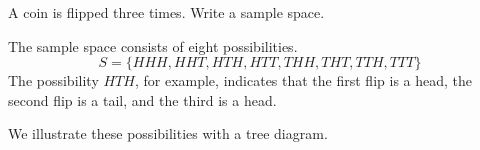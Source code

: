 \begin{example}
    A coin is flipped three times. Write a sample space.
\end{example}
\begin{solution}
    The sample space consists of eight possibilities.
    \[ S = \{HHH, HHT, HTH, HTT, THH, THT, TTH, TTT\} \]
    The possibility \( HTH \), for example, indicates that the first flip is a head, the second flip is a tail, and the third is a head.

    We illustrate these possibilities with a tree diagram.
    \begin{center}
\end{center}
\end{solution}
